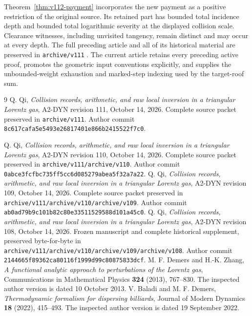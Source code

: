 \documentclass[11pt,reqno]{amsart}
\numberwithin{equation}{section}
\theoremstyle{definition}\newtheorem{definition}[theorem]{Definition}
\theoremstyle{remark}\newtheorem{remark}[theorem]{Remark}
\begin{document}
Theorem~\ref{thm:v112-payment} incorporates the new payment as a
positive restriction of the original source. Its retained part has
bounded total incidence depth and bounded total logarithmic severity
at the displayed collision scale. Clearance witnesses, including
unvisited tangency, remain distinct and may occur at every depth.
The full preceding article and all of its historical material are
preserved in \texttt{archive/v111} \cite{Q111}. The current article
retains every preceding active proof, promotes the geometric input
conventions explicitly, and supplies the unbounded-weight exhaustion
and marked-step indexing used by the target-roof sum.












\appendix







\begin{thebibliography}{9}
 Q. Qi,
\emph{Collision records, arithmetic, and raw local inversion in a
triangular Lorentz gas}, A2-DYN revision 111, October 14, 2026.
Complete source packet preserved in \texttt{archive/v111}.
Author commit \texttt{8c617cafa5e5493e26817401e866b2415522f7c0}.

 Q. Qi,
\emph{Collision records, arithmetic, and raw local inversion in a
triangular Lorentz gas}, A2-DYN revision 110, October 14, 2026.
Complete source packet preserved in \texttt{archive/v111/archive/v110}.
Author commit \texttt{0abce3fcfbc735ff5cc6d085279abea5f32a7a22}.
 Q. Qi,
\emph{Collision records, arithmetic, and raw local inversion in a
triangular Lorentz gas}, A2-DYN revision 109, October 14, 2026.
Complete source packet preserved in \texttt{archive/v111/archive/v110/archive/v109}.
Author commit \texttt{ab0ad79b9c101b82c80e33511529588d101a45c0}.
 Q. Qi,
\emph{Collision records, arithmetic, and raw local inversion in a
triangular Lorentz gas}, A2-DYN revision 108, October 14, 2026.
Frozen manuscript and complete historical supplement, preserved
byte-for-byte in \texttt{archive/v111/archive/v110/archive/v109/archive/v108}. Author commit
\texttt{2144665f89362ca80116f1999d99c80875833dcf}.
 M. F. Demers and H.-K. Zhang,
\emph{A functional analytic approach to perturbations of the Lorentz gas},
Communications in Mathematical Physics \textbf{324} (2013), 767--830.
The inspected author version is dated 10 October 2013.
 V. Baladi and M. F. Demers,
\emph{Thermodynamic formalism for dispersing billiards},
Journal of Modern Dynamics \textbf{18} (2022), 415--493.
The inspected author version is dated 19 September 2022.
\end{thebibliography}
\end{document}
